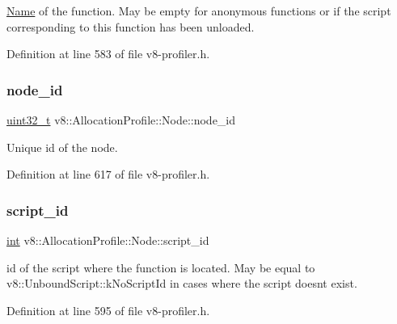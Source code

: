 \mbox{\hyperlink{classv8_1_1Name}{Name}} of the function. May be empty for anonymous functions or if the script corresponding to this function has been unloaded. 

Definition at line 583 of file v8-\/profiler.\+h.

\mbox{\label{structv8_1_1AllocationProfile_1_1Node_aa2a43ec43107692b2cfcb3b2b00aa801}} 
\subsubsection{\texorpdfstring{node\+\_\+id}{node\_id}}
{\footnotesize\ttfamily \mbox{\hyperlink{classuint32__t}{uint32\+\_\+t}} v8\+::\+Allocation\+Profile\+::\+Node\+::node\+\_\+id}

Unique id of the node. 

Definition at line 617 of file v8-\/profiler.\+h.

\mbox{\label{structv8_1_1AllocationProfile_1_1Node_a4a746de878d9ad42b32fda4c365b98fb}} 
\subsubsection{\texorpdfstring{script\+\_\+id}{script\_id}}
{\footnotesize\ttfamily \mbox{\hyperlink{classint}{int}} v8\+::\+Allocation\+Profile\+::\+Node\+::script\+\_\+id}

id of the script where the function is located. May be equal to v8\+::\+Unbound\+Script\+::k\+No\+Script\+Id in cases where the script doesn\textquotesingle{}t exist. 

Definition at line 595 of file v8-\/profiler.\+h.

\mbox{\label{structv8_1_1AllocationProfile_1_1Node_acd6567ac06a0bae713390559128e9c62}} 
